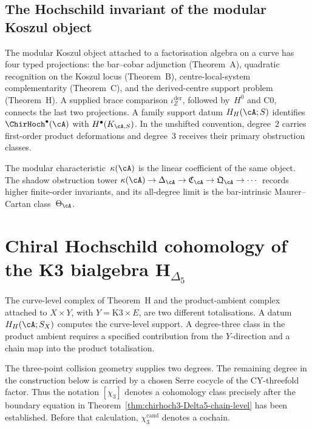 \subsection{The Hochschild invariant of the modular Koszul object}

The modular Koszul object attached to a factorisation algebra on a
curve has four typed projections: the bar--cobar adjunction
\textup{(}Theorem~A\textup{)}, quadratic recognition on the Koszul
locus \textup{(}Theorem~B\textup{)}, centre-local-system
complementarity \textup{(}Theorem~C\textup{)}, and the derived-centre
support problem \textup{(}Theorem~H\textup{)}.  A supplied brace
comparison $\iota_Z^{\mathrm{der}}$, followed by~$H^0$ and C0, connects
the last two projections.  A family support datum $H_H(\cA;S)$
identifies $\ChirHoch^\bullet(\cA)$ with
$H^\bullet(K_{\cA,S})$.  In the unshifted convention, degree~$2$
carries first-order product deformations and degree~$3$ receives their
primary obstruction classes.

The modular characteristic~$\kappa(\cA)$ is the linear coefficient of
the same object. The shadow obstruction tower
$\kappa(\cA)\to\Delta_\cA\to\mathfrak C_\cA\to\mathfrak Q_\cA\to\cdots$
records higher finite-order invariants, and its all-degree limit is
the bar-intrinsic Maurer--Cartan class~$\Theta_\cA$.

\section{Chiral Hochschild cohomology of the K3 bialgebra $\mathbf H_{\Delta_5}$}
\label{sec:hochcoh-supplement}

\begin{remark}
\label{rem:hochcoh-1}
The curve-level complex of Theorem~H and the product-ambient complex
attached to \(X\times Y\), with \(Y=\mathrm{K3}\times E\), are two
different totalisations.  A datum $H_H(\cA;S_X)$ computes the
curve-level support.  A degree-three class in the product ambient
requires a specified contribution from the \(Y\)-direction and a
chain map into the product totalisation.

The three-point collision geometry supplies two degrees.  The remaining
degree in the construction below is carried by a chosen Serre cocycle of
the CY-threefold factor.  Thus the notation \([\chi _3]\) denotes a
cohomology class precisely after the boundary equation in
Theorem~\ref{thm:chirhoch3-Delta5-chain-level} has been established.
Before that calculation, \(\chi _3^{\mathrm{cand}}\) denotes a cochain.
\end{remark}

